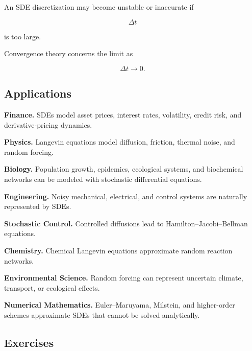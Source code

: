 An SDE discretization may become unstable or inaccurate if

\[
\Delta t
\]

is too large.

Convergence theory concerns the limit as

\[
\Delta t\to0.
\]

\subsection{Applications}
\label{subsec:sde-applications}

\begin{applicationbox}

\textbf{Finance.}
SDEs model asset prices, interest rates, volatility, credit risk, and
derivative-pricing dynamics.

\medskip

\textbf{Physics.}
Langevin equations model diffusion, friction, thermal noise, and random
forcing.

\medskip

\textbf{Biology.}
Population growth, epidemics, ecological systems, and biochemical
networks can be modeled with stochastic differential equations.

\medskip

\textbf{Engineering.}
Noisy mechanical, electrical, and control systems are naturally
represented by SDEs.

\medskip

\textbf{Stochastic Control.}
Controlled diffusions lead to Hamilton--Jacobi--Bellman equations.

\medskip

\textbf{Chemistry.}
Chemical Langevin equations approximate random reaction networks.

\medskip

\textbf{Environmental Science.}
Random forcing can represent uncertain climate, transport, or ecological
effects.

\medskip

\textbf{Numerical Mathematics.}
Euler--Maruyama, Milstein, and higher-order schemes approximate SDEs that
cannot be solved analytically.

\end{applicationbox}

\subsection{Exercises}
\label{subsec:sde-exercises}


